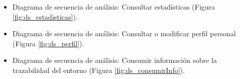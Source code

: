 \documentclass[12pt,a4paper, twoside]{report}
\begin{document}
\begin{itemize}
		
		\newpage
		
		\item Diagrama de secuencia de análisis: Consultar estadísticas (Figura \ref{fig:ds_estadisticas}).
		
		
		\newpage
		
		\item Diagrama de secuencia de análisis: Consultar o modificar perfil personal (Figura \ref{fig:ds_perfil}).
		
		
		\newpage
		
		\item Diagrama de secuencia de análisis: Consumir información sobre la trazabilidad del entorno (Figura \ref{fig:ds_consumirInfo}).
		
		
	\end{itemize}
		
\end{document}
